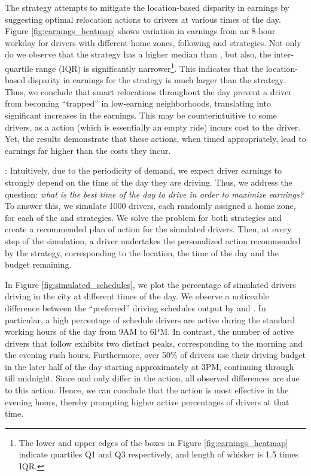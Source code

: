 The {\relocation} strategy attempts to mitigate the location-based disparity in earnings by suggesting optimal relocation actions to drivers at various times of the day. Figure \ref{fig:earnings_heatmap} shows variation in earnings from an 8-hour workday for drivers with different home zones, following {\naive} and {\relocation} strategies. Not only do we observe that the {\relocation} strategy has a higher median than {\naive}, but also, the inter-quartile range (IQR) is significantly narrower\footnote{The lower and upper edges of the boxes in Figure \ref{fig:earnings_heatmap} indicate quartiles Q1 and Q3 respectively, and length of whisker is 1.5 times IQR.}. This indicates that the location-based disparity in earnings for the {\naive} strategy is much larger than the {\relocation} strategy. Thus, we conclude that smart relocations throughout the day prevent a driver from becoming ``trapped'' in low-earning neighborhoods, translating 
into significant increases in the earnings. 
This may be counterintuitive to some drivers, as a {\relocate} action (which is essentially an empty ride) 
incurs cost to the driver. Yet, the results demonstrate that these actions, when timed appropriately, 
lead to earnings far higher than the costs they incur.

: Intuitively, due to the periodicity of demand, we expect driver earnings to strongly depend on the time of the day they are driving. 
Thus, we address the question: \textit{what is the best time of the day to drive in order to maximize earnings?} To answer this, we simulate 1000 drivers, each randomly assigned a home zone, for each of the {\flexible} and {\relocationflexible} strategies. 
We solve the {\originalproblem} problem for both strategies and create a recommended plan of action for the simulated drivers. 
Then, at every step of the simulation, a driver undertakes the personalized action recommended by the strategy, corresponding to
  the location, the time of the day and the budget remaining.


In Figure \ref{fig:simulated_schedules}, we plot the percentage of simulated drivers driving in the city at different times of the day. We observe a noticeable difference between the ``preferred'' driving schedules 
output by {\flexible} and {\relocationflexible}.
In particular, a high percentage of {\flexible} schedule drivers are active during the standard working hours of the day from 9AM to 6PM. In contrast, the number of active
drivers that follow {\relocationflexible} exhibits two distinct peaks, corresponding to the morning and the evening rush hours. Furthermore, over 50\% of {\relocationflexible} drivers use their driving budget in the later half of the day starting approximately at 3PM, continuing through till midnight. 
Since {\flexible} and {\relocationflexible} only differ in 
the {\relocate} action, all observed differences are due to this action.
Hence, we can  conclude that the {\relocate} action is most effective in the evening hours, thereby prompting higher active percentages of {\relocationflexible} drivers at that time.

